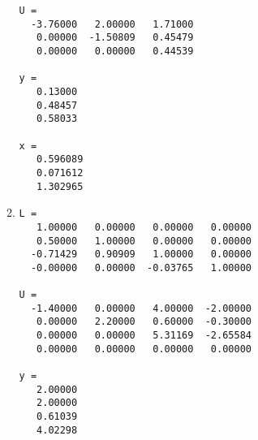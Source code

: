 \documentclass[a4paper]{article}
\begin{document}
\begin{enumerate}
\begin{enumerate}
\begin{verbatim}
U =
  -3.76000   2.00000   1.71000
   0.00000  -1.50809   0.45479
   0.00000   0.00000   0.44539

y =
   0.13000
   0.48457
   0.58033

x =
   0.596089
   0.071612
   1.302965
\end{verbatim}

  \item %
\begin{verbatim}
L =
   1.00000   0.00000   0.00000   0.00000
   0.50000   1.00000   0.00000   0.00000
  -0.71429   0.90909   1.00000   0.00000
  -0.00000   0.00000  -0.03765   1.00000

U =
  -1.40000   0.00000   4.00000  -2.00000
   0.00000   2.20000   0.60000  -0.30000
   0.00000   0.00000   5.31169  -2.65584
   0.00000   0.00000   0.00000   0.00000

y =
   2.00000
   2.00000
   0.61039
   4.02298
\end{verbatim}


\end{enumerate}
\end{enumerate}
\end{document}
